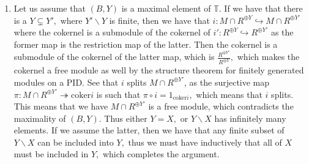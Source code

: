\documentclass{article}
\begin{document}
\begin{enumerate}
	\item Let us assume that $(B,Y)$ is a maximal element of $\mathbb{T}.$ If we have that there is a $Y \subsetneq Y',$ where $Y' \backslash Y$ is finite, 
	then we have that $i:M \cap R^{\oplus Y} \hookrightarrow M \cap R^{\oplus Y'}$ where the cokernel is a submodule of the cokernel of $i':R^{\oplus Y} 
	\hookrightarrow R^{\oplus Y'}$ as the former map is the restriction map of the latter. Then the cokernel is a submodule of the cokernel of the latter 
	map, which is $\frac{R^{\oplus Y'}}{R^{\oplus Y}},$ which makes the cokernel a free module as well by the structure theorem for finitely generated 
	modules on a PID. See that $i$ splits $M \cap R^{\oplus Y'}$, as the surjective map $\pi: M \cap R^{\oplus Y'} \twoheadrightarrow \text{coker} i$ is 
	such that $ \pi \circ i=1_{\text{coker} i},$ which means that $i$ splits. This means that we have $M \cap R^{\oplus Y'}$ is a free module, which 
	contradicts the maximality of $(B,Y).$ Thus either $Y=X,$ or $Y\backslash X$ has infinitely many elements. If we assume the latter, then we have that 
	any finite subset of $Y \backslash X$ can be included into $Y,$ thus we must have inductively that all of $X$ must be included in $Y,$ which completes 
	the argument.
\end{enumerate}
\end{document}
